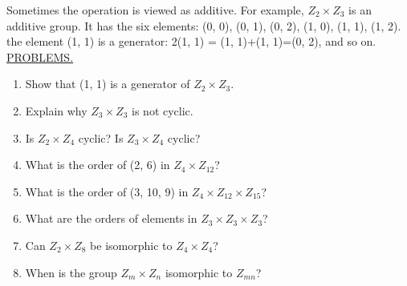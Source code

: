 \documentclass[12pt]{article}
\theoremstyle{definition}
\begin{document}
Sometimes the operation is viewed as additive.  For example, $Z_2\times Z_3$ is an additive group.  It has the six elements: (0, 0), (0, 1), (0, 2), (1, 0), (1, 1), (1, 2).  the element (1, 1) is a generator: 2(1, 1) = (1, 1)+(1, 1)=(0, 2), and so on.\\[.1in]
\underline{PROBLEMS.}
\begin{enumerate}
\item Show that (1, 1) is a generator of $Z_2\times Z_3$.
\item Explain why $Z_3\times Z_3$ is not cyclic.
\item Is $Z_2\times Z_4$ cyclic?  Is $Z_3\times Z_4$ cyclic?
\item What is the order of (2, 6) in $Z_4\times Z_{12}$?
\item What is the order of (3, 10, 9) in $Z_4\times Z_{12}\times Z_{15}$?
\item What are the orders of elements in $Z_3\times Z_3\times Z_3$?
\item Can $Z_2\times Z_8$ be isomorphic to $Z_4\times Z_4$?
\item When is the group $Z_m \times Z_n$ isomorphic to $Z_{mn}$?
\end{enumerate}
\newpage
\end{document}

